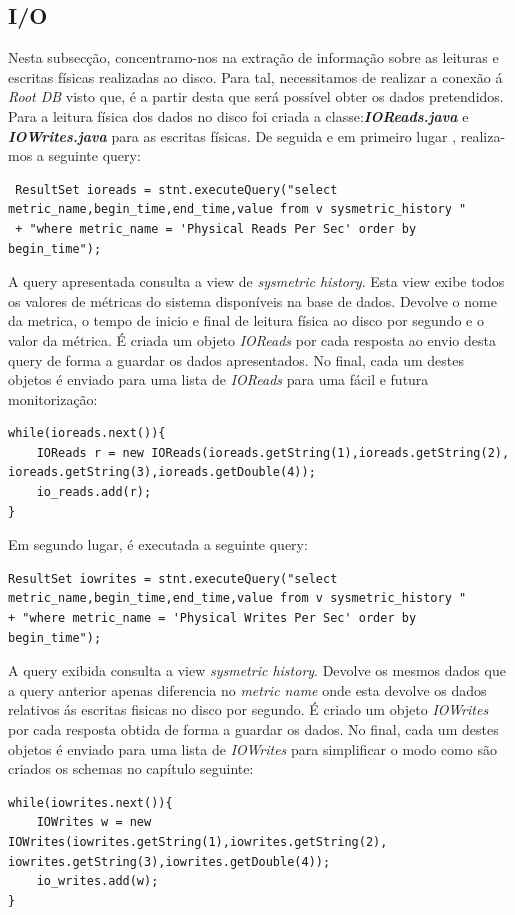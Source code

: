 \subsection*{I/O}
Nesta subsecção, concentramo-nos na extração de informação sobre as leituras e escritas físicas realizadas ao disco. Para tal, necessitamos de realizar a conexão á \textit{Root DB} visto que, é a partir desta que será possível obter os dados pretendidos. Para a leitura física dos dados no disco foi criada a classe:\textbf{\textit{IOReads.java}} e \textbf{\textit{IOWrites.java}} para as escritas físicas. De seguida e em primeiro lugar , realiza-mos a seguinte query:
\vspace{2mm}
\begin{lstlisting}
 ResultSet ioreads = stnt.executeQuery("select metric_name,begin_time,end_time,value from v sysmetric_history "
 + "where metric_name = 'Physical Reads Per Sec' order by begin_time");
\end{lstlisting}
\vspace{2mm}
A query apresentada consulta a view de \textit{sysmetric history}. Esta view exibe todos os valores de métricas do sistema disponíveis na base de dados. Devolve o nome da metrica, o tempo de inicio e final de leitura física ao disco por segundo e o valor da métrica. É criada um objeto \textit{IOReads} por cada resposta ao envio desta query de forma a guardar os dados apresentados. No final, cada um destes objetos é enviado para uma lista de \textit{IOReads} para uma fácil e futura monitorização:
\vspace{2mm}
\begin{lstlisting}
while(ioreads.next()){
    IOReads r = new IOReads(ioreads.getString(1),ioreads.getString(2), ioreads.getString(3),ioreads.getDouble(4));
    io_reads.add(r);
}
\end{lstlisting}
\vspace{2mm}
Em segundo lugar, é executada a seguinte query:
\vspace{2mm}
\begin{lstlisting}
ResultSet iowrites = stnt.executeQuery("select metric_name,begin_time,end_time,value from v sysmetric_history "
+ "where metric_name = 'Physical Writes Per Sec' order by begin_time");
\end{lstlisting}
\vspace{2mm}
A query exibida consulta a view \textit{sysmetric history}. Devolve os mesmos dados que a query anterior apenas diferencia no \textit{metric name} onde esta devolve os dados relativos ás escritas fisicas no disco por segundo. É criado um objeto \textit{IOWrites} por cada resposta obtida de forma a guardar os dados. No final, cada um destes objetos é enviado para uma lista de \textit{IOWrites} para simplificar o modo como são criados os schemas no capítulo seguinte:
\vspace{2mm}
\begin{lstlisting}
while(iowrites.next()){
    IOWrites w = new IOWrites(iowrites.getString(1),iowrites.getString(2), iowrites.getString(3),iowrites.getDouble(4));
    io_writes.add(w);
}
\end{lstlisting}